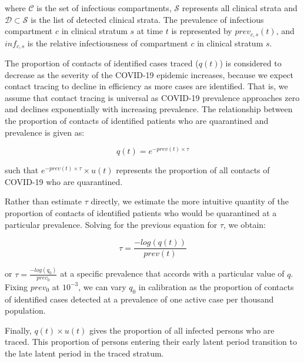 where $\mathcal{C}$ is the set of infectious compartments, $\mathcal{S}$ represents all clinical strata and $\mathcal{D} \subset \mathcal{S}$ is the list of detected clinical strata.
The prevalence of infectious compartment $c$ in clinical stratum $s$ at time $t$ is represented by $prev_{c, s}(t)$, and $inf_{c, s}$ is the relative infectiousness of compartment $c$ in clinical stratum $s$.

The proportion of contacts of identified cases traced (\(q(t)\)) is considered to decrease as the severity of the COVID-19 epidemic increases, because we expect contact tracing to decline in efficiency as more cases are identified.
That is, we assume that contact tracing is universal as COVID-19 prevalence approaches zero and declines exponentially with increasing prevalence.
The relationship between the proportion of contacts of identified patients who are quarantined and prevalence is given as:

\[q(t) = e^{-prev(t) \times \tau }\]

such that \(e^{-prev(t) \times \tau} \times u(t) \) represents the proportion of all contacts of COVID-19 who are quarantined.

Rather than estimate \(\tau\) directly, we estimate the more intuitive quantity of the proportion of contacts of identified patients who would be quarantined at a particular prevalence.
Solving for the previous equation for \(\tau\), we obtain:

\[\tau = \frac{-log(q(t))}{prev(t)} \]

or \(\tau = \frac{-log(q_{0})}{prev_{0}} \) at a specific prevalence that accords with a particular value of \(q\). Fixing \(prev_{0}\) at \(10^{-3}\), we can vary \(q_{0}\) in calibration as the proportion of contacts of identified cases detected at a prevalence of one active case per thousand population.

Finally, \(q(t) \times u(t) \) gives the proportion of all infected persons who are traced. This proportion of persons entering their early latent period transition to the late latent period in the traced stratum.
